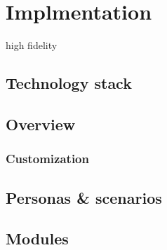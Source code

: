 \section{Implmentation}
    
high fidelity



    \subsection{Technology stack}

    \subsection{Overview}

        \subsubsection{Customization}

    \subsection{Personas \& scenarios}

    \subsection{Modules}